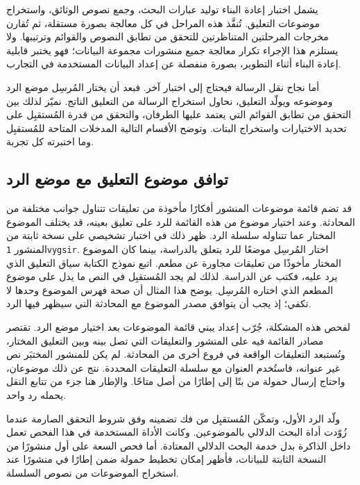يشمل اختبار إعادة البناء توليد عبارات البحث، وجمع نصوص الوثائق، واستخراج موضوعات التعليق. تُنفَّذ هذه المراحل في كل معالجة بصورة مستقلة، ثم تُقارن مخرجات المرحلتين المتناظرتين للتحقق من تطابق النصوص والقوائم وترتيبها. ولا يستلزم هذا الإجراء تكرار معالجة جميع منشورات مجموعة البيانات؛ فهو يختبر قابلية إعادة البناء أثناء التطوير، بصورة منفصلة عن إعداد البيانات المستخدمة في التجارب.

أما نجاح نقل الرسالة فيحتاج إلى اختبار آخر. فبعد أن يختار المُرسِل موضع الرد وموضوعه ويولّد التعليق، نحاول استخراج الرسالة من التعليق الناتج. نميّز لذلك بين التحقق من تطابق القوائم التي يعتمد عليها الطرفان، والتحقق من قدرة المُستقبِل على تحديد الاختيارات واستخراج البتات. وتوضح الأقسام التالية المدخلات المتاحة للمُستقبِل وما اختبرته كل تجربة.

\subsection{توافق موضوع التعليق مع موضع الرد}
\label{sec:reply-chain-probe}

قد تضم قائمة موضوعات المنشور أفكارًا مأخوذة من تعليقات تتناول جوانب مختلفة من المحادثة. وعند اختيار موضوع من هذه القائمة للرد على تعليق بعينه، قد يختلف الموضوع المختار عما تتناوله سلسلة الرد. ظهر ذلك في اختبار تشخيصي على نسخة ثابتة من المنشور \texttt{1vygsir}. اختار المُرسِل موضعًا للرد يتعلق بالدراسة، بينما كان الموضوع المختار مأخوذًا من تعليقات مجاورة عن مطعم. اتبع نموذج الكتابة سياق التعليق الذي يرد عليه، فكتب عن الدراسة. لذلك لم يجد المُستقبِل في النص ما يدل على موضوع المطعم الذي اختاره المُرسِل. يوضح هذا المثال أن صحة فهرس الموضوع وحدها لا تكفي؛ إذ يجب أن يتوافق مصدر الموضوع مع المحادثة التي سيظهر فيها الرد.

لفحص هذه المشكلة، جُرّب إعداد يبني قائمة الموضوعات بعد اختيار موضع الرد. تقتصر مصادر القائمة فيه على المنشور والتعليقات التي تصل بينه وبين التعليق المختار، وتُستبعد التعليقات الواقعة في فروع أخرى من المحادثة. لم يكن للمنشور المختبَر نص غير عنوانه، فاستُخدم العنوان مع سلسلة التعليقات المحددة. نتج عن ذلك موضوعان، واحتاج إرسال حمولة من  بتًا إلى  إطارًا من أصل  متاحًا. والإطار هنا جزء من تتابع النقل يحمله رد واحد.

ولّد  الرد الأول، وتمكّن المُستقبِل من فك تضمينه وفق شروط التحقق الصارمة عندما زُوّدت أداة البحث الدلالي بالموضوعين. وكانت الأداة المستخدمة في هذا الفحص تعمل داخل الذاكرة بدل خدمة البحث الدلالي المعتادة. أما فحص السعة على أول  منشورًا من النسخة الثابتة للبيانات، فأظهر إمكان تخطيط حمولة ضمن  إطارًا في  منشورًا عند استخراج الموضوعات من نصوص السلسلة.

